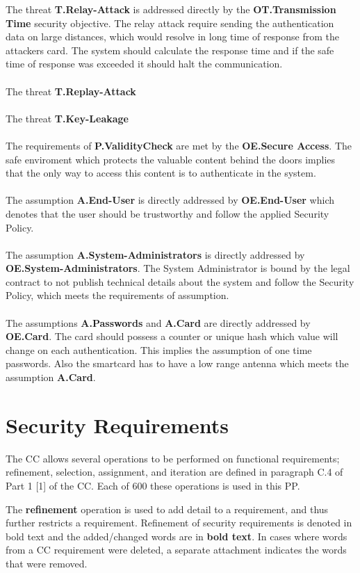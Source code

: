 \documentclass[10pt,titlepage]{article}
\begin{document}
The threat \textbf{T.Relay-Attack} is addressed directly by the \textbf{OT.Transmission Time} security objective. The relay attack require sending the authentication data on large distances, which would resolve in long time of response from the attackers card. The system should calculate the response time and if the safe time of response was exceeded it should halt the communication.
\\ \\
The threat \textbf{T.Replay-Attack}
\\ \\
The threat \textbf{T.Key-Leakage}
\\ \\
The requirements of \textbf{P.ValidityCheck}  are met by the \textbf{OE.Secure Access}. The safe enviroment which protects the valuable content behind the doors implies that the only way to access this content is to authenticate in the system.
\\ \\
The assumption \textbf{A.End-User} is directly addressed by \textbf{OE.End-User} which denotes that the user should be trustworthy and follow the applied Security Policy.
\\ \\
The assumption \textbf{A.System-Administrators} is directly addressed by \textbf{OE.System-Administrators}. The System Administrator is bound by the legal contract to not publish technical details about the system and follow the Security Policy, which meets the requirements of assumption.
\\ \\
The assumptions \textbf{A.Passwords} and \textbf{A.Card} are directly addressed by \textbf{OE.Card}. The card should possess a counter or unique hash which value will change on each authentication. This implies the assumption of one time passwords. Also the smartcard has to have a low range antenna which meets the assumption \textbf{A.Card}.

\section{Security Requirements}

The CC allows several operations to be performed on functional requirements; refinement,
selection, assignment, and iteration are defined in paragraph C.4 of Part 1 [1] of the CC. Each of 600 these operations is used in this PP.


The \textbf{refinement} operation is used to add detail to a requirement, and thus further restricts a requirement. Refinement of security requirements is denoted in bold text and the added/changed words are in \textbf{bold text}. In cases where words from a CC requirement were deleted, a separate attachment indicates the words that were removed.
\end{document}
